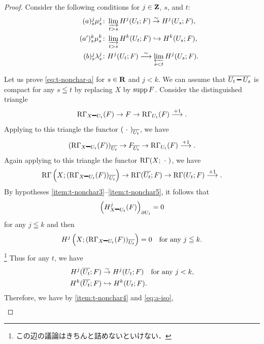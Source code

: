 \begin{proof}
  Consider the following conditions for 
  \(j\in\zz\), \(s\), and \(t\):
  \begin{align}
      \tag*{\((a)^j_s\)}\label{eq:t-nonchar-a}
      \mu_{s}^{j}&\colon
      \indlim[t>s] H^{j}(U_t;F) \simar H^{j}(U_s;F),\\
      \tag*{\((a')^k_s\)}\label{eq:t-nonchar-a'}
      \mu_{s}^{k}&\colon
      \indlim[t>s] H^{k}(U_t;F) \hookrightarrow H^{k}(U_s;F),\\
      \tag*{\((b)^j_s\)}\label{eq:t-nonchar-b}
      \lambda_{s}^{j}&\colon
      H^{j}(U_t;F)\simarr \prolim[s<t] H^{j}(U_s;F).
  \end{align}

  Let us prove \ref{eq:t-nonchar-a} for \(s\in \rr\) and \(j<k\). 
  We can assume that \(\overline{U_{t}\smi U_{s}}\) is compact 
  for any \(s\leqq t\) by replacing \(X\) by \(\supp{F}\). 
  Consider the distinguished triangle\[
    \RG_{X\smi U_{t}}(F)
    \to
    F
    \to
    \RG_{U_{t}}(F)
    \overset{+1}{\longrightarrow}.
  \]
  Applying to this triangle the functor \(
    (\blk)_{\overline{U_{t}}}
  \), we have \[
    \left(\RG_{X\smi U_{t}}(F)\right)_{\overline{U_{t}}}
    \to
    F_{\overline{U_{t}}}
    \to
    \RG_{U_{t}}(F)
    \overset{+1}{\longrightarrow}.
  \]
  Again applying to this triangle the functor \(\RG(X;\blk)\), 
  we have
  \begin{equation}
    \RG\left(X;\left(\RG_{X\smi U_{t}}(F)\right)_{\overline{U_{t}}}\right)
    \to
    \RG(\overline{U_{t}};F)
    \to
    \RG(U_{t};F)
    \overset{+1}{\longrightarrow}.
  \end{equation}
  By hypotheses \eqref{item:t-nonchar3}--\eqref{item:t-nonchar5}, 
  it follows that
  \[
    \left(H^{j}_{X\smi U_{t}}(F)\right)_{\bd{U_{t}}}=0
  \]
  for any \(j\leqq k\) and then \[
    H^{j}\left(X;
      \left(
        \RG_{X\smi U_{t}}(F)
      \right)_{\overline{U_{t}}}
    \right)=0
    \quad
    \text{for any \(j\leqq k\).}
  \] \footnote{この辺の議論はきちんと詰めないといけない．}
  Thus for any \(t\), we have
  \begin{align}
    \label{eq:a-iso}H^{j}(\overline{U_{t}};F)
    &\simar
    H^{j}(U_{t};F)\quad
    \text{for any \(j< k\),}\\
    \label{eq:a-inj}H^{k}(\overline{U_{t}};F)
    &\hookrightarrow
    H^{k}(U_{t};F).
  \end{align}
  Therefore, we have by \eqref{item:t-nonchar4} and \eqref{eq:a-iso},  
  \begin{align*}

\end{align*}
\end{proof}

